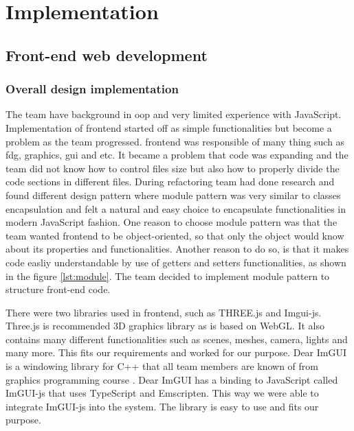 \chapter{Implementation}
\label{chap:implementation}

\section{Front-end web development}
\subsection{Overall design implementation}
\label{subsection:frontendOverallDesignImplementation}



The team have background in \gls{oop} and very limited experience with JavaScript. Implementation of \gls{frontend} started off as simple functionalities but become a problem as the team progressed. \Gls{frontend} was responsible of many thing such as \gls{fdg}, graphics, \gls{gui} and etc. It became a problem that code was expanding and the team did not know how to control files size but also how to properly divide the code sections in different files.
During refactoring team had done research and found different design pattern where module pattern \cite{scotch:javascriptpatterns} was very similar to classes encapsulation and felt a natural and easy choice to encapsulate functionalities in modern JavaScript fashion. One reason to choose module pattern was that the team wanted \gls{frontend} to be object-oriented, so that only the object would know about its properties and functionalities. Another reason to do so, is that it makes code easliy understandable by use of getters and setters functionalities, as shown in the figure \ref{lst:module}.
The team decided to implement module pattern to structure front-end code. 

There were two libraries used in \gls{frontend}, such as THREE.js and Imgui-js. Three.js is recommended \cite{cmarix:threejs} 3D graphics library as is based on WebGL. It also contains many different functionalities such as scenes, meshes, camera, lights and many more. This fits our requirements and worked for our purpose. Dear ImGUI is a windowing library for C++ that all team members are known of from graphics programming course \cite{course:graphics}. Dear ImGUI has a binding to JavaScript called ImGUI-js that uses TypeScript and Emscripten. This way we were able to integrate ImGUI-js into the system. The library is easy to use and fits our purpose.

